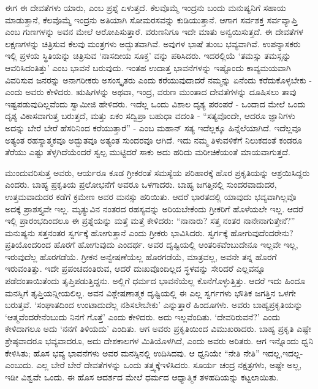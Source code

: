 ಈಗ ಈ ದೇವತೆಗಳು ಯಾರು, ಎಂಬ ಪ್ರಶ್ನೆ ಏಳುತ್ತದೆ. ಕೆಲವೊಮ್ಮೆ ಇಂದ್ರನು ಬಂದು ಮನುಷ್ಯನಿಗೆ ಸಹಾಯ ಮಾಡುತ್ತಾನೆ, ಕೆಲವೊಮ್ಮೆ ಇಂದ್ರನು ಅತಿಯಾಗಿ ಸೋಮರಸವನ್ನು ಕುಡಿಯುತ್ತಾನೆ. ಆಗಾಗ ಸರ್ವಶಕ್ತ ಸರ್ವವ್ಯಾಪ್ತಿ ಎಂಬ ಗುಣಗಳನ್ನು ಅವನ ಮೇಲೆ ಆರೋಪಿಸುತ್ತಾರೆ. ವರುಣನಿಗೂ ಇದೇ ಮಾತು ಅನ್ವಯಿಸುತ್ತದೆ. ಈ ದೇವತೆಗಳ ಲಕ್ಷಣಗಳನ್ನು ಚಿತ್ರಿಸುವ ಕೆಲವು ಮಂತ್ರಗಳು ಅದ್ಭುತವಾಗಿವೆ. ಅವುಗಳ ಭಾಷೆ ತುಂಬ ಭವ್ಯವಾಗಿವೆ. ಉಪನ್ಯಾಸಕರು ಇಲ್ಲಿ ಪ್ರಳಯ ಸ್ಥಿತಿಯನ್ನು ಚಿತ್ರಿಸುವ ‘ನಾಸದೀಯ ಸೂಕ್ತ’ ವನ್ನು ಪಠಿಸಿದರು. ಇದರಲ್ಲಿಯೆ ‘ತಮಸ್ಸು ತಮಸ್ಸನ್ನು ಆವರಿಸಿದಂತಿತ್ತು’ ಎಂಬ ಭಾವನೆ ಬರುವುದು. ಇಂತಹ ಉದಾತ್ತ ಭಾವನೆಗಳನ್ನು ಇಷ್ಟೊಂದು ಕಾವ್ಯಮಯವಾಗಿ ವಿವರಿಸುವ ಜನರನ್ನು ಅನಾಗರೀಕರು ಅಸಂಸ್ಕೃತರು ಎಂದು ಕರೆಯುವುದಾದರೆ ನಮ್ಮನ್ನು ಏನೆಂದು ಕರೆದುಕೊಳ್ಳಬೇಕು - ಎಂದು ಅವರು ಕೇಳಿದರು. ಋಷಿಗಳನ್ನು ಅಥವಾ, ಇಂದ್ರ, ವರುಣ ಮುಂತಾದ ದೇವತೆಗಳನ್ನು ದೂಷಿಸಲು ತಾವು ಇಷ್ಟಪಡುವುದಿಲ್ಲವೆಂದು ಸ್ವಾಮೀಜಿ ಹೇಳಿದರು. ಇದೆಲ್ಲ ಒಂದು ವಿಶಾಲ ದೃಶ್ಯ ಪರಂಪರೆ - ಒಂದಾದ ಮೇಲೆ ಒಂದು ದೃಶ್ಯ ವಿಕಾಸವಾಗುತ್ತ ಬರುತ್ತದೆ, ಮತ್ತು ಏಕಂ ಸದ್ವಿಪ್ರಾ ಬಹುಧಾ ವದಂತಿ - “ಸತ್ಯವೊಂದೇ, ಆದರೂ ಜ್ಞಾನಿಗಳು ಅದನ್ನು ಬೇರೆ ಬೇರೆ ಹೆಸರಿನಿಂದ ಕರೆಯುತ್ತಾರೆ” - ಎಂಬ ಮಹಾನ್​ ಸತ್ಯ ಇದೆಲ್ಲಕ್ಕೂ ಹಿನ್ನೆಲೆಯಾಗಿದೆ. ಇದೆಲ್ಲವೂ ಅತ್ಯಂತ ರಹಸ್ಯಾತ್ಮಕವೂ ಅದ್ಭುತವೂ ಅತ್ಯಂತ ಸುಂದರವೂ ಆಗಿದೆ. ಇದು ನಮ್ಮ ತಿಳುವಳಿಕೆಗೆ ನಿಲುಕದಂತೆ ಕಂಡರೂ ತೆರೆಯು ಎಷ್ಟು ತೆಳ್ಳಗಿದೆಯೆಂದರೆ ಸ್ವಲ್ಪ ಮುಟ್ಟಿದರೆ ಸಾಕು ಅದು ಹರಿದು ಮರೀಚಿಕೆಯಂತೆ ಮಾಯವಾಗುತ್ತದೆ.

ಮುಂದುವರಿಸುತ್ತ ಅವರು, ಆರ್ಯರೂ ಕೂಡ ಗ್ರೀಕರಂತೆ ಸಮಸ್ಯೆಯ ಪರಿಹಾರಕ್ಕೆ ಹೊರ ಪ್ರಕೃತಿಯನ್ನು ಆಶ್ರಯಿಸಿದ್ದರು ಎಂದರು. ಬಾಹ್ಯ ಪ್ರಕೃತಿಯ ಪ್ರಲೋಭನೆಗೆ ಅವರೂ ಒಳಗಾದರು. ಬಾಹ್ಯ ಜಗತ್ತಿನಲ್ಲಿ ಸುಂದರವಾದುದರ, ಉತ್ತಮವಾದುದರ ಕಡೆಗೆ ಕ್ರಮೇಣ ಅವರ ಮನಸ್ಸು ಹರಿಯಿತು. ಆದರೆ ಭಾರತದಲ್ಲಿ ಯಾವುದು ಭವ್ಯವಾಗಿಲ್ಲವೊ ಅದಕ್ಕೆ ಪ್ರಾಶಸ್ತ್ಯವೇ ಇಲ್ಲ. ಮೃತ್ಯುವಿನ ನಂತರದ ರಹಸ್ಯವನ್ನು ಅರಿಯಬೇಕೆಂದು ಗ್ರೀಕರಿಗೆ ಹೊಳೆಯಲೇ ಇಲ್ಲ. ಆದರೆ ಇಲ್ಲಿ ಪ್ರಾರಂಭದಿಂದಲೂ ಈ ಪ್ರಶ್ನೆಯನ್ನು ಮತ್ತೆ ಮತ್ತೆ ಕೇಳಿದರು: “ನಾನಾರು? ಸತ್ತ ನಂತರ ನಾನೇನಾಗುತ್ತೇನೆ?” ಮನುಷ್ಯನು ಸತ್ತನಂತರ ಸ್ವರ್ಗಕ್ಕೆ ಹೋಗುತ್ತಾನೆ ಎಂದು ಗ್ರೀಕರು ಭಾವಿಸಿದರು. ಸ್ವರ್ಗಕ್ಕೆ ಹೋಗುವುದೆಂದರೇನು? ಪ್ರತಿಯೊಂದರಿಂದ ಹೊರಗೆ ಹೋಗುವುದು ಎಂದರ್ಥ. ಅವರ ದೃಷ್ಟಿಯಲ್ಲಿ ಆಂತರಿಕವೆಂಬುದೇನೂ ಇಲ್ಲವೇ ಇಲ್ಲ, ಇರುವುದೆಲ್ಲ ಹೊರಗಡೆಯೆ. ಗ್ರೀಕನ ಅನ್ವೇಷಣೆಯೆಲ್ಲ ಹೊರಗಡೆಯೆ, ಮಾತ್ರವಲ್ಲ, ಅವನೇ ತನ್ನ ಹೊರಗೆ ಇರುವಂತಿತ್ತು. ಇದೇ ಪ್ರಪಂಚದಂತಿರುವ, ಆದರೆ ದುಃಖವೊಂದಿಲ್ಲದ ಸ್ಥಳವನ್ನು ಸೇರಿದರೆ ಎಲ್ಲವನ್ನೂ ಪಡೆದಂತಾಯಿತೆಂದು ತೃಪ್ತಿಪಡುತ್ತಿದ್ದನು. ಅಲ್ಲಿಗೆ ಧರ್ಮದ ಭಾವನೆಯೆಲ್ಲ ಕೊನೆಗೊಳ್ಳುತ್ತಿತ್ತು. ಆದರೆ ಇದು ಹಿಂದೂ ಮನಸ್ಸಿಗೆ ತೃಪ್ತಿಯನ್ನೀಯಲಿಲ್ಲ. ಅವನ ವಿಶ್ಲೇಷಣಾತ್ಮಕ ದೃಷ್ಟಿಯಲ್ಲಿ ಈ ಎಲ್ಲ ಸ್ವರ್ಗಗಳು ಭೌತಿಕ ಜಗತ್ತಿನ ಒಳಗೇ ಬರುತ್ತವೆ. ‘ಸಂಘಾತದಿಂದ ಉಂಟಾದುದೆಲ್ಲ ನಶಿಸಲೇಬೇಕು’ ಎನ್ನುತ್ತಾರೆ ಹಿಂದೂಗಳು. ಅವರು ಬಾಹ್ಯಪ್ರಕೃತಿಯನ್ನು ‘ಆತ್ಮವೆಂದರೇನೆಂಬುದು ನಿನಗೆ ಗೊತ್ತೆ’ ಎಂದು ಕೇಳಿದರು. ಅದು ಇಲ್ಲವೆಂದಿತು. ‘ದೇವರಿರುವನೆ?’ ಎಂದು ಕೇಳಿದಾಗಲೂ ಅದು ‘ನನಗೆ ತಿಳಿಯದು’ ಎಂದಿತು. ಆಗ ಅವರು ಪ್ರಕೃತಿಯಿಂದ ವಿಮುಖರಾದರು. ಬಾಹ್ಯ ಪ್ರಕೃತಿ ಎಷ್ಟೇ ಶ್ರೇಷ್ಠವಾದರೂ ಭವ್ಯವಾದರೂ, ಅದು ದೇಶಕಾಲಗಳ ಮಿತಿಯೊಳಗಿದೆ, ಎಂದು ಅವರು ಅರಿತರು. ಆಗ ಇನ್ನೊಂದು ಧ್ವನಿ ಕೇಳಿಸಿತು; ಹೊಸ ಭವ್ಯ ಭಾವನೆಗಳು ಅವರ ಮನಸ್ಸಿನಲ್ಲಿ ಉದಿಸಿದವು. ಆ ಧ್ವನಿಯೇ “ನೇತಿ ನೇತಿ” ಇದಲ್ಲ,\break ಇದಲ್ಲ- ಎಂಬುದು. ಎಲ್ಲ ಬೇರೆ ಬೇರೆ ದೇವತೆಗಳನ್ನು ಒಂದು ತತ್ತ್ವಕ್ಕೆ\break ಇಳಿಸಿದರು. ಸೂರ್ಯ ಚಂದ್ರ ನಕ್ಷತ್ರಗಳು, ಅಷ್ಟೇ ಅಲ್ಲ, ಇಡೀ ವಿಶ್ವವೇ ಒಂದು. ಈ ಹೊಸ ಆದರ್ಶದ ಮೇಲೆ ಧರ್ಮದ ಆಧ್ಯಾತ್ಮಿಕ ತಳಹದಿಯನ್ನು ಕಟ್ಟಲಾಯಿತು.

